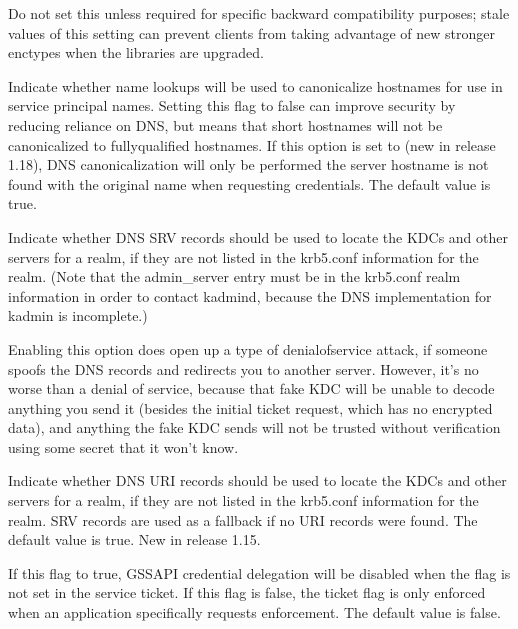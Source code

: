 \documentclass[letterpaper,10pt,english]{sphinxmanual}
\begin{document}
\begin{description}
\sphinxAtStartPar
Do not set this unless required for specific backward
compatibility purposes; stale values of this setting can prevent
clients from taking advantage of new stronger enctypes when the
libraries are upgraded.

\item[{\sphinxstylestrong{dns\_canonicalize\_hostname}}] \leavevmode
\sphinxAtStartPar
Indicate whether name lookups will be used to canonicalize
hostnames for use in service principal names.  Setting this flag
to false can improve security by reducing reliance on DNS, but
means that short hostnames will not be canonicalized to
fully\sphinxhyphen{}qualified hostnames.  If this option is set to  (new
in release 1.18), DNS canonicalization will only be performed the
server hostname is not found with the original name when
requesting credentials.  The default value is true.

\item[{\sphinxstylestrong{dns\_lookup\_kdc}}] \leavevmode
\sphinxAtStartPar
Indicate whether DNS SRV records should be used to locate the KDCs
and other servers for a realm, if they are not listed in the
krb5.conf information for the realm.  (Note that the admin\_server
entry must be in the krb5.conf realm information in order to
contact kadmind, because the DNS implementation for kadmin is
incomplete.)

\sphinxAtStartPar
Enabling this option does open up a type of denial\sphinxhyphen{}of\sphinxhyphen{}service
attack, if someone spoofs the DNS records and redirects you to
another server.  However, it’s no worse than a denial of service,
because that fake KDC will be unable to decode anything you send
it (besides the initial ticket request, which has no encrypted
data), and anything the fake KDC sends will not be trusted without
verification using some secret that it won’t know.

\item[{\sphinxstylestrong{dns\_uri\_lookup}}] \leavevmode
\sphinxAtStartPar
Indicate whether DNS URI records should be used to locate the KDCs
and other servers for a realm, if they are not listed in the
krb5.conf information for the realm.  SRV records are used as a
fallback if no URI records were found.  The default value is true.
New in release 1.15.

\item[{\sphinxstylestrong{enforce\_ok\_as\_delegate}}] \leavevmode
\sphinxAtStartPar
If this flag to true, GSSAPI credential delegation will be
disabled when the  flag is not set in the
service ticket.  If this flag is false, the 
ticket flag is only enforced when an application specifically
requests enforcement.  The default value is false.


\end{description}
\end{document}
